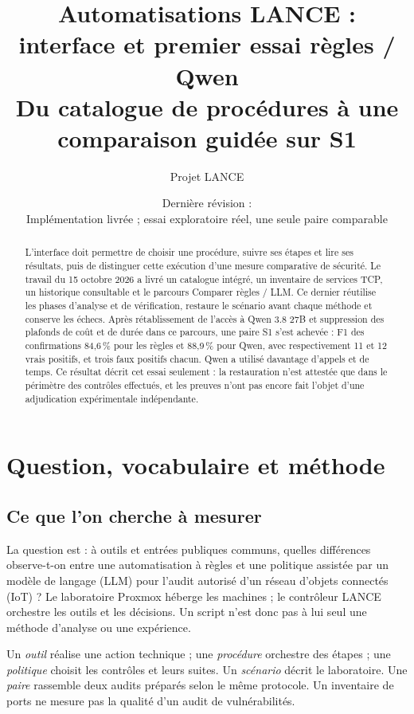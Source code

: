 \documentclass[11pt,a4paper]{article}
\title{Automatisations LANCE :\\interface et premier essai règles / Qwen\\
 \large Du catalogue de procédures à une comparaison guidée sur S1}
\author{Projet LANCE}
\date{Dernière révision : \revision\\[4pt]
 \small Implémentation livrée ; essai exploratoire réel, une seule paire comparable}
\begin{document}
\maketitle
\begin{abstract}
L'interface doit permettre de choisir une procédure, suivre ses étapes et lire
ses résultats, puis de distinguer cette exécution d'une mesure comparative de
sécurité. Le travail du 15 octobre 2026 a livré un catalogue intégré, un
inventaire de services TCP, un historique consultable et le parcours
\og Comparer règles / LLM\fg{}. Ce dernier réutilise les phases d'analyse et de
vérification, restaure le scénario avant chaque méthode et conserve les échecs.
Après rétablissement de l'accès à Qwen 3.8 27B et suppression des plafonds de coût
et de durée dans ce parcours, une paire S1 s'est achevée : F1 des confirmations
84,6\,\% pour les règles et 88,9\,\% pour Qwen, avec respectivement 11 et 12
vrais positifs, et trois faux positifs chacun. Qwen a utilisé davantage d'appels
et de temps. Ce résultat décrit cet essai seulement : la restauration n'est
attestée que dans le périmètre des contrôles effectués, et les preuves n'ont pas
encore fait l'objet d'une adjudication expérimentale indépendante.
\end{abstract}
\tableofcontents

\clearpage
\section{Question, vocabulaire et méthode}
\subsection{Ce que l'on cherche à mesurer}
La question est : à outils et entrées publiques communs, quelles différences
observe-t-on entre une automatisation à règles et une politique assistée par un
modèle de langage (LLM) pour l'audit autorisé d'un réseau d'objets connectés
(IoT) ? Le laboratoire Proxmox héberge les machines ; le contrôleur LANCE
orchestre les outils et les décisions. Un script n'est donc pas à lui seul une
méthode d'analyse ou une expérience.

Un \emph{outil} réalise une action technique ; une \emph{procédure} orchestre
des étapes ; une \emph{politique} choisit les contrôles et leurs suites. Un
\emph{scénario} décrit le laboratoire. Une \emph{paire} rassemble deux audits
préparés selon le même protocole. Un inventaire de ports ne mesure pas la
qualité d'un audit de vulnérabilités.
\end{document}
